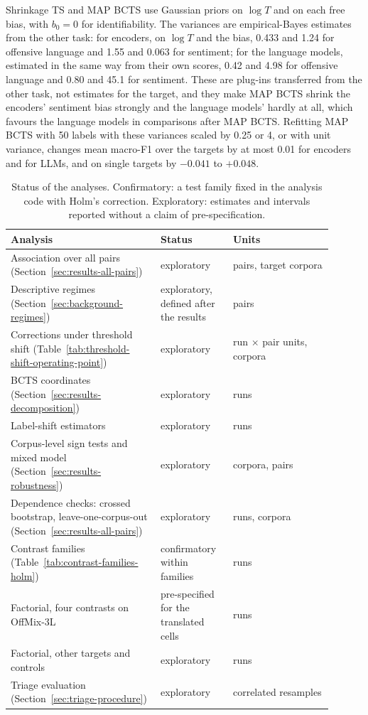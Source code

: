 Shrinkage TS and MAP BCTS use Gaussian priors on $\log T$ and on each free bias, with $b_0 = 0$ for identifiability. The
variances are empirical-Bayes estimates from the other task: for encoders, on $\log T$ and the bias, 0.433 and 1.24 for
offensive language and 1.55 and 0.063 for sentiment; for the language models, estimated in the same way from their
own scores, 0.42 and 4.98 for offensive language and 0.80 and 45.1 for sentiment. These are plug-ins transferred from
the other task, not estimates for the target, and they make MAP BCTS shrink the encoders' sentiment bias strongly and
the language models' hardly at all, which favours the language models in comparisons after MAP BCTS. Refitting MAP BCTS with 50 labels with these variances scaled by
0.25 or 4, or with unit variance, changes mean macro-F1 over the targets by at most 0.01 for encoders and for LLMs, and on
single targets by $-0.041$ to $+0.048$.



\begin{table}[t]
\centering
\small
\caption{Status of the analyses. Confirmatory: a test family fixed in the analysis code with Holm's correction.
Exploratory: estimates and intervals reported without a claim of pre-specification.}
\label{tab:analysis-status}
\begin{tabular}{p{0.42\linewidth}p{0.2\linewidth}p{0.28\linewidth}}
\toprule
Analysis & Status & Units \\
\midrule
Association over all pairs (Section~\ref{sec:results-all-pairs}) & exploratory & pairs, target corpora \\
Descriptive regimes (Section~\ref{sec:background-regimes}) & exploratory, defined after the results & pairs \\
Corrections under threshold shift (Table~\ref{tab:threshold-shift-operating-point}) & exploratory & run $\times$ pair units, corpora \\
BCTS coordinates (Section~\ref{sec:results-decomposition}) & exploratory & runs \\
Label-shift estimators & exploratory & runs \\
Corpus-level sign tests and mixed model (Section~\ref{sec:results-robustness}) & exploratory & corpora, pairs \\
Dependence checks: crossed bootstrap, leave-one-corpus-out (Section~\ref{sec:results-all-pairs}) & exploratory & runs, corpora \\
Contrast families (Table~\ref{tab:contrast-families-holm}) & confirmatory within families & runs \\
Factorial, four contrasts on OffMix-3L & pre-specified for the translated cells & runs \\
Factorial, other targets and controls & exploratory & runs \\
Triage evaluation (Section~\ref{sec:triage-procedure}) & exploratory & correlated resamples \\
\bottomrule
\end{tabular}
\end{table}

